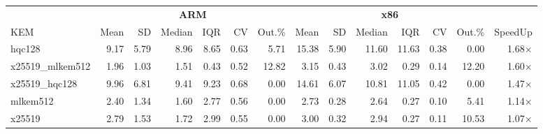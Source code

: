 \begin{table}[!ht]
\centering
\begin{tabular}{l|rrrrrr|rrrrrr|r}
\toprule
& \multicolumn{6}{c}{\bfseries ARM} & \multicolumn{6}{c}{\bfseries x86} & \\
\cmidrule(lr){2-7} \cmidrule(lr){8-13}
KEM & Mean & SD & Median & IQR & CV & Out.\% & Mean & SD & Median & IQR & CV & Out.\% & SpeedUp \\
\midrule
hqc128 & 9.17 & 5.79 & 8.96 & 8.65 & 0.63 & 5.71 & 15.38 & 5.90 & 11.60 & 11.63 & 0.38 & 0.00 & 1.68× \\
x25519_mlkem512 & 1.96 & 1.03 & 1.51 & 0.43 & 0.52 & 12.82 & 3.15 & 0.43 & 3.02 & 0.29 & 0.14 & 12.20 & 1.60× \\
x25519_hqc128 & 9.96 & 6.81 & 9.41 & 9.23 & 0.68 & 0.00 & 14.61 & 6.07 & 10.81 & 11.05 & 0.42 & 0.00 & 1.47× \\
mlkem512 & 2.40 & 1.34 & 1.60 & 2.77 & 0.56 & 0.00 & 2.73 & 0.28 & 2.64 & 0.27 & 0.10 & 5.41 & 1.14× \\
x25519 & 2.79 & 1.53 & 1.72 & 2.99 & 0.55 & 0.00 & 3.00 & 0.32 & 2.94 & 0.27 & 0.11 & 10.53 & 1.07× \\
\bottomrule
\end{tabular}
\end{table}
